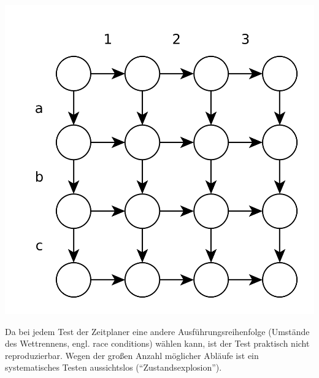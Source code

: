 \includegraphics[width=.4\textwidth]{Nondeterminism}

Da bei jedem Test der Zeitplaner eine andere Ausführungsreihenfolge (Umstände des Wettrennens, engl. race conditions) wählen kann, ist der Test praktisch nicht reproduzierbar. Wegen der großen Anzahl möglicher Abläufe ist ein systematisches Testen aussichtslos ("`Zustandsexplosion"').